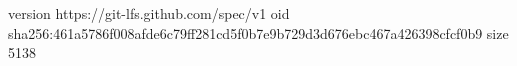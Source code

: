 version https://git-lfs.github.com/spec/v1
oid sha256:461a5786f008afde6c79ff281cd5f0b7e9b729d3d676ebc467a426398cfcf0b9
size 5138
